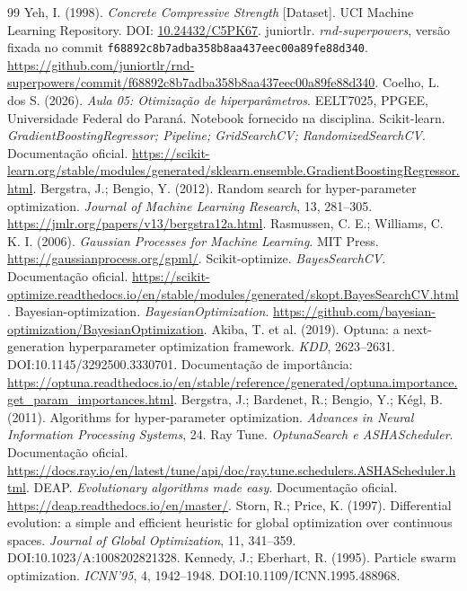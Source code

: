 \documentclass[12pt,a4paper]{article}
\begin{document}
\begin{thebibliography}{99}
 Yeh, I. (1998). \emph{Concrete Compressive Strength} [Dataset].
UCI Machine Learning Repository. DOI: \href{https://doi.org/10.24432/C5PK67}{10.24432/C5PK67}.
 juniortlr. \emph{rnd-superpowers}, versão fixada no commit
\texttt{f68892c8b7adba358b8aa437eec00a89fe88d340}.
\url{https://github.com/juniortlr/rnd-superpowers/commit/f68892c8b7adba358b8aa437eec00a89fe88d340}.
 Coelho, L. dos S. (2026). \emph{Aula 05: Otimização de hiperparâmetros}.
EELT7025, PPGEE, Universidade Federal do Paraná. Notebook fornecido na disciplina.
 Scikit-learn. \emph{GradientBoostingRegressor; Pipeline; GridSearchCV;
RandomizedSearchCV}. Documentação oficial.
\url{https://scikit-learn.org/stable/modules/generated/sklearn.ensemble.GradientBoostingRegressor.html}.
 Bergstra, J.; Bengio, Y. (2012). Random search for hyper-parameter
optimization. \emph{Journal of Machine Learning Research}, 13, 281--305.
\url{https://jmlr.org/papers/v13/bergstra12a.html}.
 Rasmussen, C. E.; Williams, C. K. I. (2006).
\emph{Gaussian Processes for Machine Learning}. MIT Press.
\url{https://gaussianprocess.org/gpml/}.
 Scikit-optimize. \emph{BayesSearchCV}. Documentação oficial.
\url{https://scikit-optimize.readthedocs.io/en/stable/modules/generated/skopt.BayesSearchCV.html}.
 Bayesian-optimization. \emph{BayesianOptimization}.
\url{https://github.com/bayesian-optimization/BayesianOptimization}.
 Akiba, T. et al. (2019). Optuna: a next-generation hyperparameter
optimization framework. \emph{KDD}, 2623--2631. DOI:10.1145/3292500.3330701.
Documentação de importância: \url{https://optuna.readthedocs.io/en/stable/reference/generated/optuna.importance.get_param_importances.html}.
 Bergstra, J.; Bardenet, R.; Bengio, Y.; Kégl, B. (2011).
Algorithms for hyper-parameter optimization. \emph{Advances in Neural Information Processing Systems}, 24.
 Ray Tune. \emph{OptunaSearch e ASHAScheduler}. Documentação oficial.
\url{https://docs.ray.io/en/latest/tune/api/doc/ray.tune.schedulers.ASHAScheduler.html}.
 DEAP. \emph{Evolutionary algorithms made easy}. Documentação oficial.
\url{https://deap.readthedocs.io/en/master/}.
 Storn, R.; Price, K. (1997). Differential evolution: a simple and efficient
heuristic for global optimization over continuous spaces. \emph{Journal of Global Optimization}, 11, 341--359.
DOI:10.1023/A:1008202821328.
 Kennedy, J.; Eberhart, R. (1995). Particle swarm optimization.
\emph{ICNN'95}, 4, 1942--1948. DOI:10.1109/ICNN.1995.488968.
\end{thebibliography}
\end{document}
